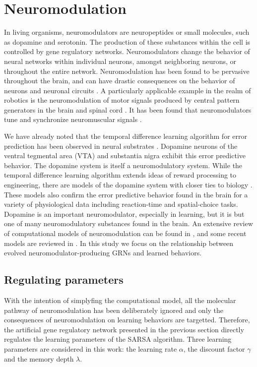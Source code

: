 \section{Neuromodulation}
In living organisms, neuromodulators are neuropeptides or small molecules, such as dopamine and
serotonin. The production of these substances within the cell is controlled by
gene regulatory networks. Neuromodulators change the behavior of neural networks
within individual neurons, amongst neighboring neurons, or throughout the entire
network. Neuromodulation has been found to be pervasive throughout the brain,
and can have drastic consequences on the behavior of neurons and neuronal
circuits \cite{Destexhe2004,Marder2012,Marder2002}. A particularly applicable
example in the realm of robotics is the neuromodulation of motor signals
produced by central pattern generators in the brain and spinal cord
\cite{Katz1995}. It has been found that neuromodulators tune and synchronize
neuromuscular signals \cite{Zhurov2006}.

We have already noted that the temporal difference learning algorithm for error
prediction has been observed in neural substrates \cite{Schultz1993}.
Dopamine neurons of the ventral tegmental area (VTA) and substantia nigra
exhibit this error predictive behavior. The dopamine system is itself a 
neuromodulatory system. While the temporal difference learning algorithm
extends ideas of reward processing to engineering, there are models of
the dopamine system with closer ties to biology \cite{Montague1996}. These
models also confirm the error predictive behavior found in the brain for a
variety of physiological data including reaction-time and spatial-choice
tasks. Dopamine is an important neuromodulator, especially in learning, but
it is but one of many neuromodulatory substances found in the brain. An
extensive review of computational models of neuromodulation can be found in
\cite{Fellous1998}, and some recent models are reviewed in \cite{Marder2012}.
In this study we focus on the relationship between evolved neuromodulator-producing
GRNs and learned behaviors. 

\subsection{Regulating parameters}
With the intention of simplyfing the computational model, all the molecular pathway of neuromodulation has been deliberately ignored and only the consequences of neuromodulation on learning behaviors are targetted. Therefore, the artificial gene regulatory network presented in the previous section directly regulates the learning parameters of the SARSA algorithm. Three learning parameters are considered in this work: the learning rate $\alpha$, the discount factor $\gamma$ and the memory depth $\lambda$.

